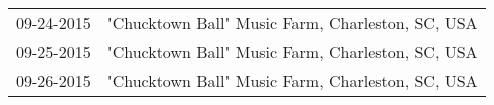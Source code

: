 \begin{supertabular}{ll}
 09-24-2015 &  "Chucktown Ball" Music Farm, Charleston, SC, USA \\
 09-25-2015 &  "Chucktown Ball" Music Farm, Charleston, SC, USA \\
 09-26-2015 &  "Chucktown Ball" Music Farm, Charleston, SC, USA \\
\end{supertabular}
